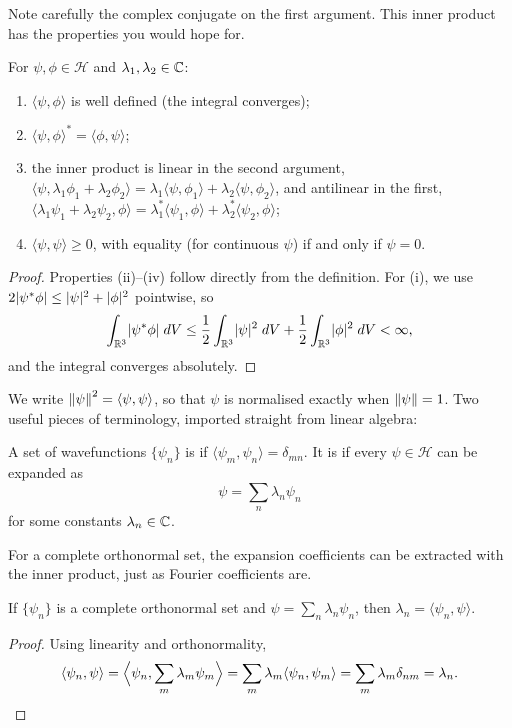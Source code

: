 \documentclass[a4paper]{scrartcl}
\newcommand{\inp}[2]{\langle #1, #2 \rangle}
\begin{document}
Note carefully the complex conjugate on the first argument. This inner product has the properties you would hope for.

\begin{proposition}
    For $\psi, \phi \in \mathcal{H}$ and $\lambda_1, \lambda_2 \in \mathbb{C}$:
    \begin{enumerate}[label=(\roman*)]
        \item $\inp{\psi}{\phi}$ is well defined (the integral converges);
        \item $\inp{\psi}{\phi}^* = \inp{\phi}{\psi}$;
        \item the inner product is linear in the second argument, $\inp{\psi}{\lambda_1 \phi_1 + \lambda_2 \phi_2} = \lambda_1 \inp{\psi}{\phi_1} + \lambda_2 \inp{\psi}{\phi_2}$, and antilinear in the first, $\inp{\lambda_1 \psi_1 + \lambda_2 \psi_2}{\phi} = \lambda_1^* \inp{\psi_1}{\phi} + \lambda_2^* \inp{\psi_2}{\phi}$;
        \item $\inp{\psi}{\psi} \geq 0$, with equality (for continuous $\psi$) if and only if $\psi = 0$.
    \end{enumerate}
\end{proposition}
\begin{proof}
    Properties (ii)--(iv) follow directly from the definition. For (i), we use $2\lvert\psi^* \phi\rvert \leq \lvert\psi\rvert^2 + \lvert\phi\rvert^2$ pointwise, so
    $$
    \int_{\mathbb{R}^3} \lvert\psi^* \phi\rvert \; d V \leq \frac{1}{2} \int_{\mathbb{R}^3} \lvert\psi\rvert^2 \; d V + \frac{1}{2}\int_{\mathbb{R}^3} \lvert\phi\rvert^2 \; d V < \infty,
    $$
    and the integral converges absolutely.
\end{proof}

We write $\norm{\psi}^2 = \inp{\psi}{\psi}$, so that $\psi$ is normalised exactly when $\norm{\psi} = 1$. Two useful pieces of terminology, imported straight from linear algebra:

\begin{definition}
    A set of wavefunctions $\{\psi_n\}$ is  if $\inp{\psi_m}{\psi_n} = \delta_{mn}$. It is  if every $\psi \in \mathcal{H}$ can be expanded as
    $$
    \psi = \sum_n \lambda_n \psi_n
    $$
    for some constants $\lambda_n \in \mathbb{C}$.
\end{definition}

For a complete orthonormal set, the expansion coefficients can be extracted with the inner product, just as Fourier coefficients are.

\begin{proposition}
    If $\{\psi_n\}$ is a complete orthonormal set and $\psi = \sum_n \lambda_n \psi_n$, then $\lambda_n = \inp{\psi_n}{\psi}$.
\end{proposition}
\begin{proof}
    Using linearity and orthonormality,
    $$
    \inp{\psi_n}{\psi} = \Big\langle \psi_n, \sum_m \lambda_m \psi_m \Big\rangle = \sum_m \lambda_m \inp{\psi_n}{\psi_m} = \sum_m \lambda_m \delta_{nm} = \lambda_n. \qedhere
    $$
\end{proof}
\end{document}
